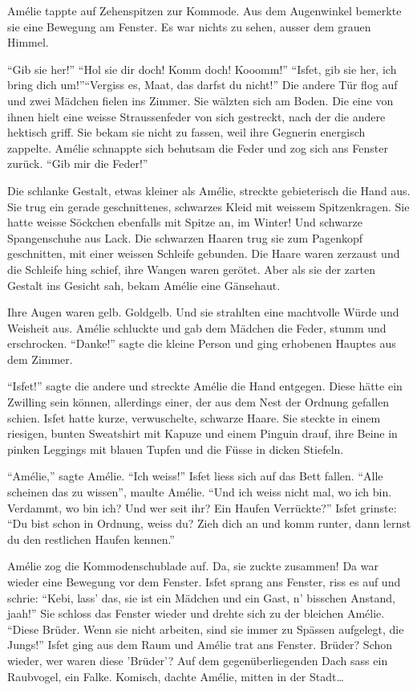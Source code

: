 \documentclass[11pt,titlepage,a5paper]{book}
\begin{document}
Amélie tappte auf Zehenspitzen zur Kommode. Aus dem Augenwinkel bemerkte sie eine Bewegung am Fenster. Es war nichts zu sehen, ausser dem grauen Himmel.

 "`Gib sie her!"' "`Hol sie dir doch! Komm doch! Kooomm!"' "`Isfet, gib sie her, ich bring dich um!"'"`Vergiss es, Maat, das darfst du nicht!"' Die andere Tür flog auf und zwei Mädchen fielen ins Zimmer. Sie wälzten sich am Boden. Die eine von ihnen hielt eine weisse Straussenfeder von sich gestreckt, nach der die andere hektisch griff. Sie bekam sie nicht zu fassen, weil ihre Gegnerin energisch zappelte. Amélie schnappte sich behutsam die Feder und zog sich ans Fenster zurück. "`Gib mir die Feder!"'

Die schlanke Gestalt, etwas kleiner als Amélie, streckte gebieterisch die Hand aus. Sie trug ein gerade geschnittenes, schwarzes Kleid mit weissem Spitzenkragen. Sie hatte weisse Söckchen ebenfalls mit Spitze an, im Winter! Und schwarze Spangenschuhe aus Lack. Die schwarzen Haaren trug sie zum Pagenkopf geschnitten, mit einer weissen Schleife gebunden. Die Haare waren zerzaust und die Schleife hing schief, ihre Wangen waren gerötet. Aber als sie der zarten Gestalt ins Gesicht sah, bekam Amélie eine Gänsehaut.

 Ihre Augen waren gelb. Goldgelb. Und sie strahlten eine machtvolle Würde und Weisheit aus. Amélie schluckte und gab dem Mädchen die Feder, stumm und erschrocken. "`Danke!"' sagte die kleine Person und ging erhobenen Hauptes aus dem Zimmer. 
 
 "`Isfet!"' sagte die andere und streckte Amélie die Hand entgegen. Diese hätte ein Zwilling sein können, allerdings einer, der aus dem Nest der Ordnung gefallen schien. Isfet hatte kurze, verwuschelte, schwarze Haare. Sie steckte in einem riesigen, bunten Sweatshirt mit Kapuze und einem Pinguin drauf, ihre Beine in pinken Leggings mit blauen Tupfen und die Füsse in dicken Stiefeln.
 
"`Amélie,"' sagte Amélie. "`Ich weiss!"' Isfet liess sich auf das Bett fallen. "`Alle scheinen das zu wissen"', maulte Amélie. "`Und ich weiss nicht mal, wo ich bin. Verdammt, wo bin ich? Und wer seit ihr? Ein Haufen Verrückte?"' Isfet grinste: "`Du bist schon in Ordnung, weiss du? Zieh dich an und komm runter, dann lernst du den restlichen Haufen kennen."'

Amélie zog die Kommodenschublade auf. Da, sie zuckte zusammen! Da war wieder eine Bewegung vor dem Fenster. Isfet sprang ans Fenster, riss es auf und schrie: "`Kebi, lass' das, sie ist ein Mädchen und ein Gast, n' bisschen Anstand, jaah!"' Sie schloss das Fenster wieder und drehte sich zu der bleichen Amélie. "`Diese Brüder. Wenn sie nicht arbeiten, sind sie immer zu Spässen aufgelegt, die Jungs!"' Isfet ging aus dem Raum und Amélie trat ans Fenster. Brüder? Schon wieder, wer waren diese 'Brüder'? Auf dem gegenüberliegenden Dach sass ein Raubvogel, ein Falke. Komisch, dachte Amélie, mitten in der Stadt\dots
\end{document}
